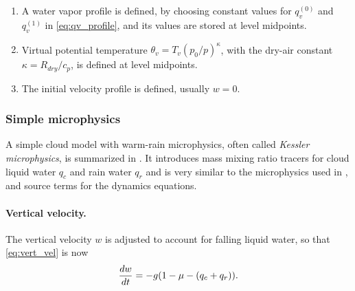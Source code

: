\begin{enumerate}
  \item A water vapor profile is defined, by choosing constant values for $q_v^{(0)}$ and $q_v^{(1)}$ in \eqref{eq:qv_profile}, and its values are stored at level midpoints.
  \item Virtual potential temperature $\theta_v = T_v(p_0/p)^{\kappa}$, with the dry-air constant $\kappa = R_{dry}/c_p$, is defined at level midpoints.
  \item The initial velocity profile is defined, usually $w=0$.  
\end{enumerate}


\subsubsection{Simple microphysics}

A simple cloud model with warm-rain microphysics, often called \emph{Kessler microphysics}, is summarized in \cite[ch.~15]{RogersYau}.
It introduces mass mixing ratio tracers for cloud liquid water $q_c$ and rain water $q_r$ and is very similar to the microphysics used in \cite{SoongOgura1973,KlempWilhelmson1978}, and source terms for the dynamics equations.

\paragraph{Vertical velocity.} The vertical velocity $w$ is adjusted to account for falling liquid water, so that \eqref{eq:vert_vel} is now
\begin{equation*}
  \frac{ d w}{d t} = -g(1-\mu -(q_c+q_r)).  
\end{equation*}


